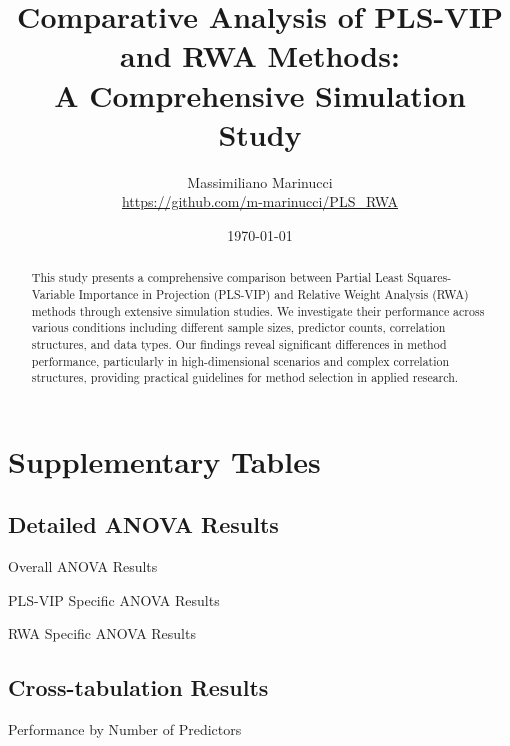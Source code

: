 \documentclass[12pt,a4paper]{article}
\title{Comparative Analysis of PLS-VIP and RWA Methods: \\
A Comprehensive Simulation Study}
\author{Massimiliano Marinucci\\
\href{https://github.com/m-marinucci/PLS_RWA}{https://github.com/m-marinucci/PLS\_RWA}}
\date{\today}
\begin{document}
\maketitle

\begin{abstract}
This study presents a comprehensive comparison between Partial Least Squares-Variable Importance in Projection (PLS-VIP) and Relative Weight Analysis (RWA) methods through extensive simulation studies. We investigate their performance across various conditions including different sample sizes, predictor counts, correlation structures, and data types. Our findings reveal significant differences in method performance, particularly in high-dimensional scenarios and complex correlation structures, providing practical guidelines for method selection in applied research.
\end{abstract}







\appendix


\section{Supplementary Tables}
\label{sec:appendix}

\subsection{Detailed ANOVA Results}
\begin{table}[H]
\centering
\caption{Overall ANOVA Results}
\label{tab:overall_anova}

\end{table}

\begin{table}[H]
\centering
\caption{PLS-VIP Specific ANOVA Results}
\label{tab:plsvip_anova}

\end{table}

\begin{table}[H]
\centering
\caption{RWA Specific ANOVA Results}
\label{tab:rwa_anova}

\end{table}

\subsection{Cross-tabulation Results}
\begin{table}[H]
\centering
\caption{Performance by Number of Predictors}
\label{tab:crosstab_j}

\end{table}
\end{document}
